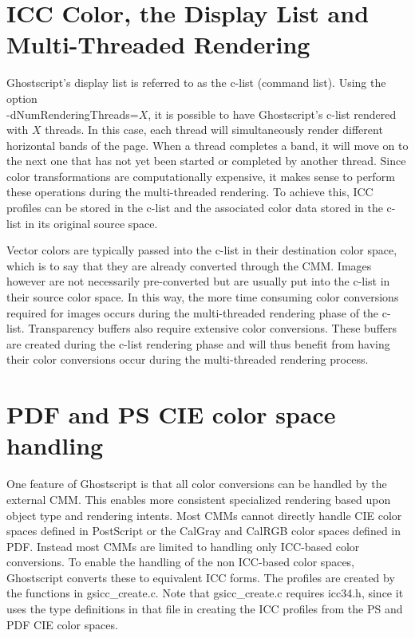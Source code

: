 \documentclass[12pt,notitlepage]{article}
\begin{document}
\singlespace

\section{ICC Color, the Display List and Multi-Threaded Rendering}

Ghostscript's display list is referred to as the c-list (command list).  Using the option\\ -dNumRenderingThreads=$X$, it is possible to have Ghostscript's c-list rendered with $X$ threads.  In this case, each thread will simultaneously render different horizontal bands of the page.  When a thread completes a band, it will move on to the next one that has not yet been started or completed by another thread.
Since color transformations are computationally expensive, it makes sense to perform these operations during the multi-threaded rendering.  To achieve this, ICC profiles can be stored in the c-list and the associated color data stored in the c-list in its original source space.

Vector colors are typically passed into the c-list in their destination color space, which is to say that they are already converted through the CMM.  Images however are not necessarily pre-converted but are usually put into the c-list in their source color space.  In this way, the more time consuming color conversions required for images occurs during the multi-threaded rendering phase of the c-list.  Transparency buffers also require extensive color conversions.  These buffers are created during the c-list rendering phase and will thus benefit from having their color conversions occur during the multi-threaded rendering process.

\section{PDF and PS CIE color space handling}

One feature of Ghostscript is that all color conversions can be handled by the external CMM.  This enables more consistent specialized rendering based upon object type and rendering intents.  Most CMMs cannot directly handle CIE color spaces defined in PostScript or the CalGray and CalRGB color spaces defined in PDF.  Instead most CMMs are limited to handling only ICC-based color conversions.  To enable the handling of the non ICC-based color spaces, Ghostscript converts these to equivalent ICC forms.   The profiles are created by the functions in gsicc\_create.c.  Note that gsicc\_create.c requires icc34.h, since it uses the type definitions in that file in creating the ICC profiles from the PS and PDF CIE color spaces.
\end{document}
